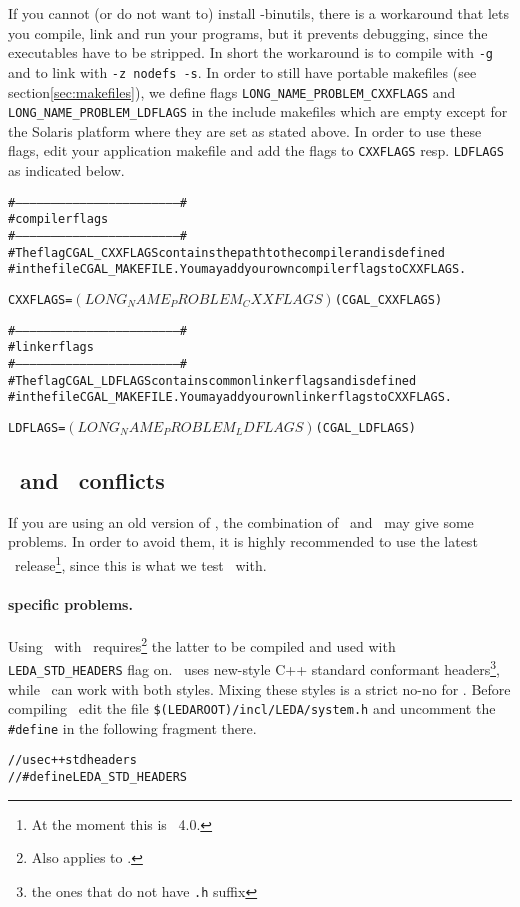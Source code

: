 If you cannot (or do not want to) install \gnu -binutils, there is a
workaround that lets you compile, link and run your programs, but it
prevents debugging, since the executables have to be stripped. In
short the workaround is to compile with \texttt{-g} and to link with
\texttt{-z nodefs -s}. In order to still have portable makefiles (see
section\ref{sec:makefiles}), we define flags
\texttt{LONG\_NAME\_PROBLEM\_CXXFLAGS} and
\texttt{LONG\_NAME\_PROBLEM\_LDFLAGS} in the include makefiles which
are empty except for the Solaris platform where they are set as stated
above. In order to use these flags, edit your application makefile and
add the flags to \texttt{CXXFLAGS} resp. \texttt{LDFLAGS} as indicated
below.
\begin{alltt}
#---------------------------------------------------------------------#
#                    compiler flags
#---------------------------------------------------------------------#
# The flag CGAL_CXXFLAGS contains the path to the compiler and is defined
# in the file CGAL_MAKEFILE. You may add your own compiler flags to CXXFLAGS.

CXXFLAGS = $(LONG_NAME_PROBLEM_CXXFLAGS) $(CGAL_CXXFLAGS) 

#---------------------------------------------------------------------#
#                    linker flags
#---------------------------------------------------------------------#
# The flag CGAL_LDFLAGS contains common linker flags and is defined
# in the file CGAL_MAKEFILE. You may add your own linker flags to CXXFLAGS.

LDFLAGS = $(LONG_NAME_PROBLEM_LDFLAGS) $(CGAL_LDFLAGS) 
\end{alltt}

\subsection{\leda\ and \stl\ conflicts}\label{subs:ledastlconfl}

If you are using an old version of \leda, the combination of \leda\ 
and \stl\ may give some problems. In order to avoid them, it is highly
recommended to use the latest \leda\ release\footnote{At the moment
  this is \leda\ 4.0.}, since this is what we test \cgal\ with.

\paragraph{\msvc\-specific problems.}
Using \msvc\ with \leda\ requires\footnote{Also applies to \bcc .} the
latter to be compiled and used with \texttt{LEDA\_STD\_HEADERS} flag
on. \cgal\ uses new-style C++ standard conformant headers\footnote{the
  ones that do not have \texttt{.h} suffix}, while \leda\ can work
with both styles. Mixing these styles is a strict no-no for \msvc.
Before compiling \leda\, edit the file
\texttt{\$(LEDAROOT)/incl/LEDA/system.h} and uncomment the
\texttt{\#define} in the following fragment there.
\begin{alltt}
// use c++ std headers
//#define LEDA_STD_HEADERS
\end{alltt}

